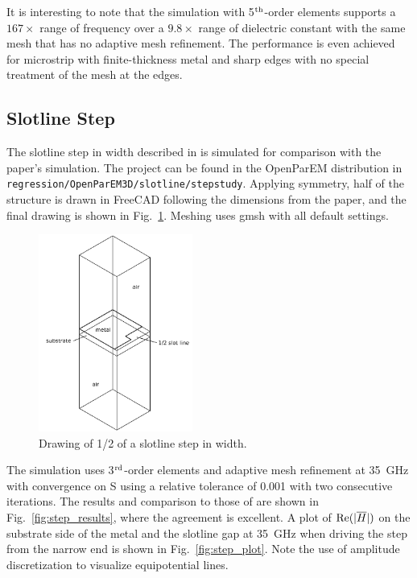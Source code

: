 \documentclass[titlepage]{article}
\renewcommand\_{\textunderscore\linebreak[1]}
\begin{document}
It is interesting to note that the simulation with  5$^{\textnormal{th}}$-order elements supports a $167\times$ range of frequency over a $9.8\times$ range of dielectric constant with the same mesh that has no adaptive mesh refinement.  The performance is even achieved for microstrip with finite-thickness metal and sharp edges with no special treatment of the mesh at the edges.

\subsection{Slotline Step}

The slotline step in width described in \cite{Hirayama} is simulated for comparison with the paper's simulation.  The project can be found in the OpenParEM distribution in \texttt{regression/OpenParEM3D/slotline/step\_study}.  Applying symmetry, half of the structure is drawn in FreeCAD following the dimensions from the paper, and the final drawing is shown in Fig.~\ref{fig:step_drawing}.  Meshing uses gmsh with all default settings.

\begin{figure}[H]
  \centering
  \includegraphics[width=0.45\textwidth]{../regression/OpenParEM3D/slotline/step_study/screenshots/step_drawing}
  \caption{Drawing of 1/2 of a slotline step in width.}
  \label{fig:step_drawing}
\end{figure}

The simulation uses 3$^{\textnormal{rd}}$-order elements and adaptive mesh refinement at 35~GHz with convergence on S using a relative tolerance of 0.001 with two consecutive iterations.  The results and comparison to those of \cite{Hirayama} are shown in Fig.~\ref{fig:step_results}, where the agreement is excellent.  A plot of $\textnormal{Re}(|\overline{H}|)$ on the substrate side of the metal and the slotline gap at 35~GHz when driving the step from the narrow end is shown in Fig.~\ref{fig:step_plot}.  Note the use of amplitude discretization to visualize equipotential lines.
\end{document}
